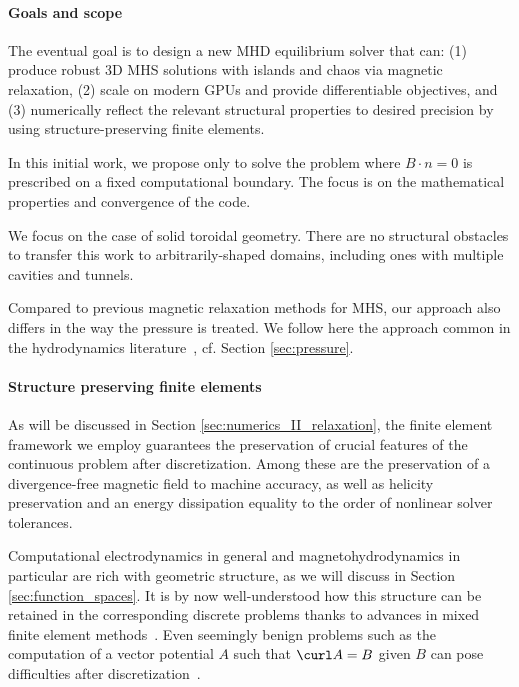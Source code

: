 \documentclass[%
 reprint,
 superscriptaddress,
 amsmath,amssymb,
 aps, nofootinbib, floatfix]{revtex4-2}
\begin{document}
\paragraph{Goals and scope}
The eventual goal is to design a new MHD equilibrium solver that can: (1) produce robust 3D MHS solutions with islands and chaos via magnetic relaxation, (2) scale on modern GPUs and provide differentiable objectives, and (3) numerically reflect the relevant structural properties to desired precision by using structure-preserving finite elements.

In this initial work, we propose only to solve the problem where $B \cdot n = 0$ is prescribed on a fixed computational boundary. The focus is on the mathematical properties and convergence of the code. 

We focus on the case of solid toroidal geometry. There are no structural obstacles to transfer this work to arbitrarily-shaped domains, including ones with multiple cavities and tunnels. 

Compared to previous magnetic relaxation methods for MHS, our approach also differs in the way the pressure is treated. We follow here the approach common in the hydrodynamics literature~\citep{moffatt_topological_2021}, cf. Section \ref{sec:pressure}.

\paragraph{Structure preserving finite elements}
As will be discussed in Section \ref{sec:numerics_II_relaxation}, the finite element framework we employ guarantees the preservation of crucial features of the continuous problem after discretization. Among these are the preservation of a divergence-free magnetic field to machine accuracy, as well as helicity preservation and an energy dissipation equality to the order of nonlinear solver tolerances. 

Computational electrodynamics in general and magnetohydrodynamics in particular are rich with geometric structure, as we will discuss in Section \ref{sec:function_spaces}. It is by now well-understood how this structure can be retained in the corresponding discrete problems thanks to advances in mixed finite element methods~\citep{arnold_finite_2006, boffi_mixed_2013}. Even seemingly benign problems such as the computation of a vector potential $A$ such that $\curl A = B$ given $B$ can pose difficulties after discretization~\citep[Chapter 5]{boffi_mixed_2013}.
\end{document}
